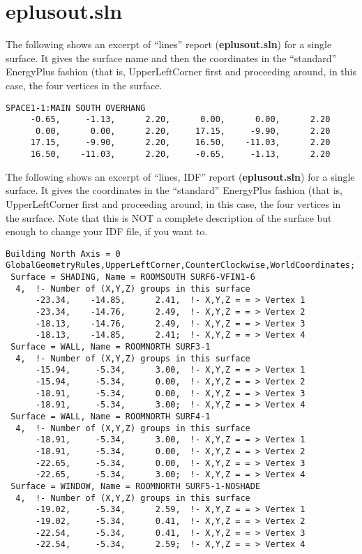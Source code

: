 \section{eplusout.sln}

The following shows an excerpt of “lines” report (\textbf{eplusout.sln}) for a single surface. It gives the surface name and then the coordinates in the “standard” EnergyPlus fashion (that is, UpperLeftCorner first and proceeding around, in this case, the four vertices in the surface.

\begin{lstlisting}
SPACE1-1:MAIN SOUTH OVERHANG
     -0.65,     -1.13,      2.20,      0.00,      0.00,      2.20
      0.00,      0.00,      2.20,     17.15,     -9.90,      2.20
     17.15,     -9.90,      2.20,     16.50,    -11.03,      2.20
     16.50,    -11.03,      2.20,     -0.65,     -1.13,      2.20
\end{lstlisting}

The following shows an excerpt of “lines, IDF” report (\textbf{eplusout.sln}) for a single surface. It gives the coordinates in the “standard” EnergyPlus fashion (that is, UpperLeftCorner first and proceeding around, in this case, the four vertices in the surface. Note that this is NOT a complete description of the surface but enough to change your IDF file, if you want to.

\begin{lstlisting}
Building North Axis = 0
GlobalGeometryRules,UpperLeftCorner,CounterClockwise,WorldCoordinates;
 Surface = SHADING, Name = ROOMSOUTH SURF6-VFIN1-6
  4,  !- Number of (X,Y,Z) groups in this surface
      -23.34,    -14.85,      2.41,  !- X,Y,Z = = > Vertex 1
      -23.34,    -14.76,      2.49,  !- X,Y,Z = = > Vertex 2
      -18.13,    -14.76,      2.49,  !- X,Y,Z = = > Vertex 3
      -18.13,    -14.85,      2.41;  !- X,Y,Z = = > Vertex 4
 Surface = WALL, Name = ROOMNORTH SURF3-1
  4,  !- Number of (X,Y,Z) groups in this surface
      -15.94,     -5.34,      3.00,  !- X,Y,Z = = > Vertex 1
      -15.94,     -5.34,      0.00,  !- X,Y,Z = = > Vertex 2
      -18.91,     -5.34,      0.00,  !- X,Y,Z = = > Vertex 3
      -18.91,     -5.34,      3.00;  !- X,Y,Z = = > Vertex 4
 Surface = WALL, Name = ROOMNORTH SURF4-1
  4,  !- Number of (X,Y,Z) groups in this surface
      -18.91,     -5.34,      3.00,  !- X,Y,Z = = > Vertex 1
      -18.91,     -5.34,      0.00,  !- X,Y,Z = = > Vertex 2
      -22.65,     -5.34,      0.00,  !- X,Y,Z = = > Vertex 3
      -22.65,     -5.34,      3.00;  !- X,Y,Z = = > Vertex 4
 Surface = WINDOW, Name = ROOMNORTH SURF5-1-NOSHADE
  4,  !- Number of (X,Y,Z) groups in this surface
      -19.02,     -5.34,      2.59,  !- X,Y,Z = = > Vertex 1
      -19.02,     -5.34,      0.41,  !- X,Y,Z = = > Vertex 2
      -22.54,     -5.34,      0.41,  !- X,Y,Z = = > Vertex 3
      -22.54,     -5.34,      2.59;  !- X,Y,Z = = > Vertex 4
\end{lstlisting}
